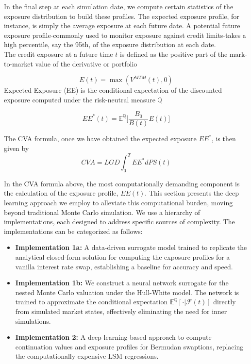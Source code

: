     \noindent
    In the final step at each simulation date, we compute certain statistics of the exposure distribution to build these profiles. The expected exposure profile, for instance, is simply the average exposure at each future date. A potential future exposure profile-commonly used to monitor exposure against credit limits-takes a high percentile, say the 95th, of the exposure distribution at each date.\\

    \noindent
    The credit exposure at a future time $t$ is defined as the positive part of the mark-to-market value of the derivative or portfolio

    \begin{equation}
        E(t) = \max\left(V^{MTM}(t), 0\right)
    \end{equation}
    \noindent
    Expected Exposure (EE) is the conditional expectation of the discounted exposure computed under the risk-neutral measure $\mathbb{Q}$

    \begin{equation}\label{eq:ee}
        EE^{*}(t) = \mathbb{E}^{\mathbb{Q}} \Big [ \frac{B_0}{B(t)} E(t) \Big]
    \end{equation}
    
    \noindent
    The CVA formula, once we have obtained the expected exposure $EE^{*}$, is then given by 
    \begin{equation}
        CVA = LGD \int_{0}^{T} EE^{*}dPS(t)
    \end{equation}

    \noindent
    In the CVA formula above, the most computationally demanding component is the calculation of the exposure profile, $EE(t)$. This section presents the deep learning approach we employ to alleviate this computational burden, moving beyond traditional Monte Carlo simulation. We use a hierarchy of implementations, each designed to address specific sources of complexity. The implementations can be categorized as follows:

    \begin{itemize}
    \item \textbf{Implementation 1a:} A data-driven surrogate model trained to replicate the analytical closed-form solution for computing the exposure profiles for a vanilla interest rate swap, establishing a baseline for accuracy and speed.
    
    \item \textbf{Implementation 1b:} We construct a neural network surrogate for the nested Monte Carlo valuation under the Hull-White model. The network is trained to approximate the conditional expectation $\mathbb{E}^\mathbb{Q}[\cdot | \mathscr{F}(t)]$ directly from simulated market states, effectively eliminating the need for inner simulations.\\
    
    \item \textbf{Implementation 2:} A deep learning-based approach to compute continuation values and exposure profiles for Bermudan swaptions, replacing the computationally expensive LSM regressions.
     \\
     \end{itemize}

